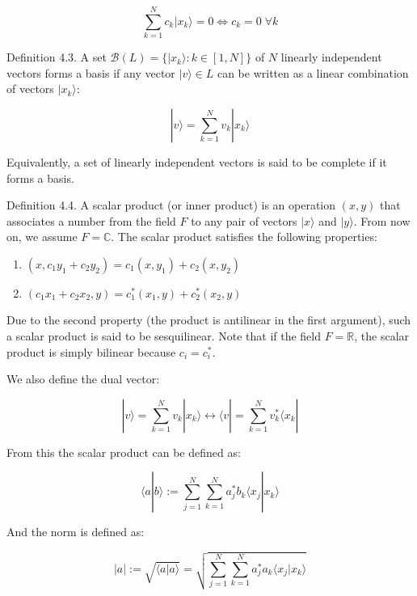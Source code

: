 \begin{equation}
\sum_{k=1}^{N} c_k|x_k\rangle = 0 \Longleftrightarrow c_k = 0 \;\forall k
\end{equation}

Definition 4.3. A set $\mathcal{B}(L) = \{|x_k\rangle: k \in [1,N]\}$ of $N$ linearly independent vectors forms a basis if any vector $|v\rangle \in L$ can be written as a linear combination of vectors $|x_k\rangle$:

\begin{equation}
|v\rangle = \sum_{k=1}^{N} v_k|x_k\rangle
\end{equation}

Equivalently, a set of linearly independent vectors is said to be complete if it forms a basis.

Definition 4.4. A scalar product (or inner product) is an operation $(x,y)$ that associates a number from the field $F$ to any pair of vectors $|x\rangle$ and $|y\rangle$. From now on, we assume $F = \mathbb{C}$. The scalar product satisfies the following properties:

\begin{enumerate}
  \item $(x, c_1y_1 + c_2y_2) = c_1(x,y_1) + c_2(x,y_2)$
  \item $(c_1x_1 + c_2x_2, y) = c_1^*(x_1,y) + c_2^*(x_2,y)$
\end{enumerate}

Due to the second property (the product is antilinear in the first argument), such a scalar product is said to be sesquilinear. Note that if the field $F = \mathbb{R}$, the scalar product is simply bilinear because $c_i = c_i^*$.

We also define the dual vector:

\begin{equation}
|v\rangle = \sum_{k=1}^{N} v_k|x_k\rangle \longleftrightarrow \langle v| = \sum_{k=1}^{N} v_k^*\langle x_k|
\end{equation}

From this the scalar product can be defined as:

\begin{equation}
\langle a|b\rangle := \sum_{j=1}^{N}\sum_{k=1}^{N} a_j^*b_k\langle x_j|x_k\rangle
\end{equation}

And the norm is defined as:

\begin{equation}
|a| := \sqrt{\langle a|a\rangle} = \sqrt{\sum_{j=1}^{N}\sum_{k=1}^{N} a_j^*a_k\langle x_j|x_k\rangle}
\end{equation}

